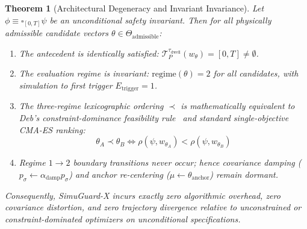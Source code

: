 \documentclass[journal]{IEEEtran}
\newtheorem{theorem}{Theorem}
\begin{document}
\begin{theorem}[Architectural Degeneracy and Invariant Invariance]
\label{thm:invariant_degeneracy}
Let $\phi \equiv \square_{[0, T]} \psi$ be an unconditional safety invariant. Then for all physically admissible candidate vectors $\theta \in \Theta_{\text{admissible}}$:
\begin{enumerate}
    \item The antecedent is identically satisfied: $\mathcal{T}_P^{\tau_{\text{dwell}}}(w_\theta) = [0, T] \neq \emptyset$.
    \item The evaluation regime is invariant: $\mathrm{regime}(\theta) = 2$ for all candidates, with simulation to first trigger $E_{\mathrm{trigger}} = 1$.
    \item The three-regime lexicographic ordering $\prec$ is mathematically equivalent to Deb's constraint-dominance feasibility rule~\cite{deb2000efficient} and standard single-objective CMA-ES ranking:
    \begin{equation}
    \theta_A \prec \theta_B \iff \rho(\psi, w_{\theta_A}) < \rho(\psi, w_{\theta_B})
    \end{equation}
    \item Regime $1 \to 2$ boundary transitions never occur; hence covariance damping ($p_\sigma \leftarrow \alpha_{\mathrm{damp}} p_\sigma$) and anchor re-centering ($\mu \leftarrow \theta_{\mathrm{anchor}}$) remain dormant.
\end{enumerate}
Consequently, SimuGuard-X incurs exactly zero algorithmic overhead, zero covariance distortion, and zero trajectory divergence relative to unconstrained or constraint-dominated optimizers on unconditional specifications.
\end{theorem}
\end{document}
